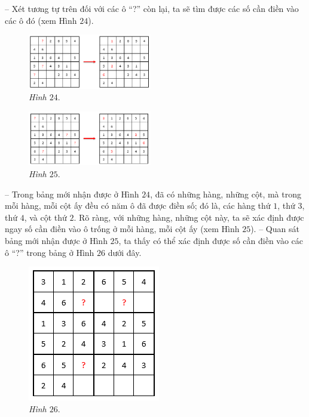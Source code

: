 	-- Xét tương tự trên đối với các ô “?” còn lại, ta sẽ tìm được các số cần điền vào các ô đó (xem Hình $24$).
	\begin{multicols}{2}
		\begin{figure}[H]
			\centering
			\vspace*{-5pt}
			\captionsetup{labelformat= empty, justification=centering}
			\includegraphics[width=0.48\textwidth]{pic13}
			\caption{\small\textit{Hình $24.$}}
			\vspace*{-10pt}
		\end{figure}
		\begin{figure}[H]
			\centering
			\vspace*{-5pt}
			\captionsetup{labelformat= empty, justification=centering}
			\includegraphics[width=0.48\textwidth]{pic14}
			\caption{\small\textit{Hình $25.$}}
			\vspace*{-10pt}
		\end{figure}
	\end{multicols}
	-- Trong bảng mới nhận được ở Hình $24$, đã có những hàng, những cột, mà trong mỗi hàng, mỗi cột ấy đều có năm ô đã được điền số; đó là, các hàng thứ $1$, thứ $3$, thứ $4$, và cột thứ $2$. Rõ ràng, với những hàng, những cột này, ta sẽ xác định được ngay số cần điền vào ô trống ở mỗi hàng, mỗi cột ấy (xem Hình $25$).
	\vskip 0.1cm
	-- Quan sát bảng mới nhận được ở Hình $25$, ta thấy có thể xác định được số cần điền vào các ô “?” trong bảng ở Hình $26$ dưới đây.
	\vskip 0.1cm
		\begin{figure}
		\centering
		\vspace*{-15pt}
		\captionsetup{labelformat= empty, justification=centering}
		\includegraphics[scale=0.48]{pic15}
		\vspace*{-5pt}
		\caption{\small\textit{Hình $26.$}}
		\vspace*{-15pt}
	\end{figure}
